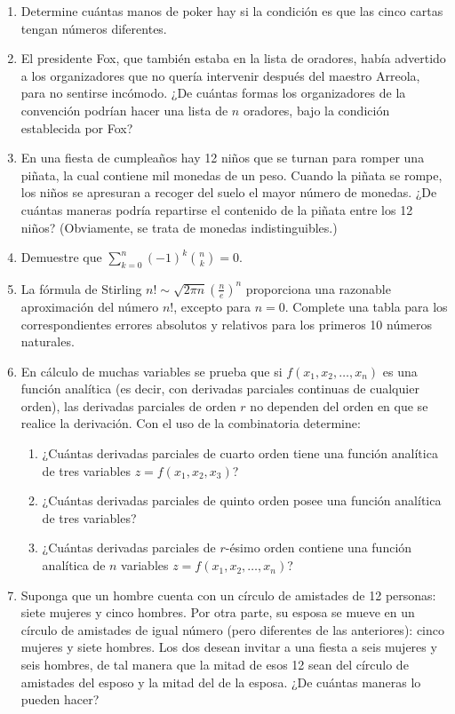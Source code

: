 \begin{Ejer}
\begin{enumerate}
\item Determine cu\'antas manos de poker hay si la condici\'on es que las cinco cartas tengan n\'umeros diferentes.

\item El presidente Fox, que tambi\'en estaba en la lista de oradores, hab\'ia advertido a los organizadores que no quer\'ia intervenir despu\'es del maestro Arreola, para no sentirse inc\'omodo. ¿De cu\'antas formas los organizadores de la convenci\'on podr\'ian hacer una lista de $n$ oradores, bajo la condici\'on establecida por Fox?

\item En una fiesta de cumplea\~nos hay 12 ni\~nos que se turnan para romper una pi\~nata, la cual contiene mil monedas de un peso. Cuando la pi\~nata se rompe, los ni\~nos se apresuran a recoger del suelo el mayor n\'umero de monedas. ¿De cu\'antas maneras podr\'ia repartirse el contenido de la pi\~nata entre los 12 ni\~nos? (Obviamente, se trata de monedas indistinguibles.)

\item Demuestre que $\sum_{k=0}^{n}(-1)^k\binom{n}{k}=0.$

\item La f\'ormula de Stirling $n! \sim \sqrt{2\pi n}\left(\frac{n}{e}\right)^n$
proporciona una razonable aproximaci\'on del n\'umero $n!$, excepto para $n=0$. Complete una tabla para los correspondientes errores absolutos y relativos para los primeros 10 n\'umeros naturales.

\item En c\'alculo de muchas variables se prueba que si $f(x_1,x_2,\dots,x_n)$ es una funci\'on anal\'itica (es decir, con derivadas parciales continuas de cualquier orden), las derivadas parciales de orden $r$ no dependen del orden en que se realice la derivaci\'on. Con el uso de la combinatoria determine:
\begin{enumerate}
\item ¿Cu\'antas derivadas parciales de cuarto orden tiene una funci\'on anal\'itica de tres variables $z=f(x_1,x_2,x_3)$?
\item ¿Cu\'antas derivadas parciales de quinto orden posee una funci\'on anal\'itica de tres variables?
\item ¿Cu\'antas derivadas parciales de $r$-\'esimo orden contiene una funci\'on anal\'itica de $n$ variables $z=f(x_1,x_2,\dots,x_n)$?
\end{enumerate}

\item Suponga que un hombre cuenta con un c\'irculo de amistades de 12 personas: siete mujeres y cinco hombres. Por otra parte, su esposa se mueve en un c\'irculo de amistades de igual n\'umero (pero diferentes de las anteriores): cinco mujeres y siete hombres. Los dos desean invitar a una fiesta a seis mujeres y seis hombres, de tal manera que la mitad de esos 12 sean del c\'irculo de amistades del esposo y la mitad del de la esposa. ¿De cu\'antas maneras lo pueden hacer?


\end{enumerate}
\end{Ejer}
